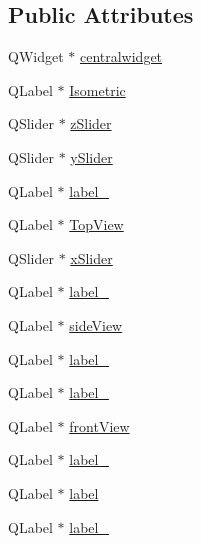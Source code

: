 \subsection*{Public Attributes}
\begin{DoxyCompactItemize}
\item 
Q\+Widget $\ast$ \mbox{\hyperlink{class_ui___show_projections_ada05f9201dc75906972f38298dc917a7}{centralwidget}}
\item 
Q\+Label $\ast$ \mbox{\hyperlink{class_ui___show_projections_a5467e3e7878ab80f5481145e09a2c982}{Isometric}}
\item 
Q\+Slider $\ast$ \mbox{\hyperlink{class_ui___show_projections_a93249521ba2f7bd85762769534710801}{z\+Slider}}
\item 
Q\+Slider $\ast$ \mbox{\hyperlink{class_ui___show_projections_aa25759b69798fc85b83617f8b614eefe}{y\+Slider}}
\item 
Q\+Label $\ast$ \mbox{\hyperlink{class_ui___show_projections_a8b5cd8a90f825a30b129c4fd6022b510}{label\+\_}}
\item 
Q\+Label $\ast$ \mbox{\hyperlink{class_ui___show_projections_a1d9ee9d755851442b14d5916f2385df3}{Top\+View}}
\item 
Q\+Slider $\ast$ \mbox{\hyperlink{class_ui___show_projections_a73c91a390071d9bb5192d57ec437900e}{x\+Slider}}
\item 
Q\+Label $\ast$ \mbox{\hyperlink{class_ui___show_projections_ac0f147f25e7d89d4ab0630cd1d12b4e4}{label\+\_}}
\item 
Q\+Label $\ast$ \mbox{\hyperlink{class_ui___show_projections_a7633c7c8ef1dd57e3c13cbd85973130d}{side\+View}}
\item 
Q\+Label $\ast$ \mbox{\hyperlink{class_ui___show_projections_a85ac72c61730bb69191b37090b182ac9}{label\+\_}}
\item 
Q\+Label $\ast$ \mbox{\hyperlink{class_ui___show_projections_a1d513379a4bac54aced645ccd6f0ca86}{label\+\_}}
\item 
Q\+Label $\ast$ \mbox{\hyperlink{class_ui___show_projections_aa241948cc1b98e5d27634ed407046d16}{front\+View}}
\item 
Q\+Label $\ast$ \mbox{\hyperlink{class_ui___show_projections_a70454562373a4fbaf69a7a753d7f14c4}{label\+\_}}
\item 
Q\+Label $\ast$ \mbox{\hyperlink{class_ui___show_projections_ae89f3d81af5295e170a36fd11016f0ed}{label}}
\item 
Q\+Label $\ast$ \mbox{\hyperlink{class_ui___show_projections_a97c04ce929e7403a48ffb47c97515653}{label\+\_}}

\end{DoxyCompactItemize}

